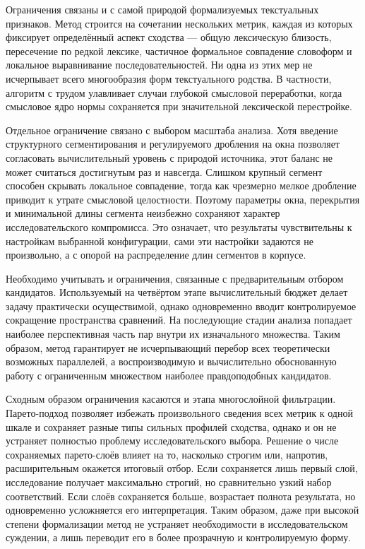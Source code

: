 Ограничения связаны и с самой природой формализуемых текстуальных признаков. Метод строится на сочетании нескольких метрик, каждая из которых фиксирует определённый аспект сходства --- общую лексическую близость, пересечение по редкой лексике, частичное формальное совпадение словоформ и локальное выравнивание последовательностей. Ни одна из этих мер не исчерпывает всего многообразия форм текстуального родства. В частности, алгоритм с трудом улавливает случаи глубокой смысловой переработки, когда смысловое ядро нормы сохраняется при значительной лексической перестройке.

Отдельное ограничение связано с выбором масштаба анализа. Хотя введение структурного сегментирования и регулируемого дробления на окна позволяет согласовать вычислительный уровень с природой источника, этот баланс не может считаться достигнутым раз и навсегда. Слишком крупный сегмент способен скрывать локальное совпадение, тогда как чрезмерно мелкое дробление приводит к утрате смысловой целостности. Поэтому параметры окна, перекрытия и минимальной длины сегмента неизбежно сохраняют характер исследовательского компромисса. Это означает, что результаты чувствительны к настройкам выбранной конфигурации, сами эти настройки задаются не произвольно, а с опорой на распределение длин сегментов в корпусе.

Необходимо учитывать и ограничения, связанные с предварительным отбором кандидатов. Используемый на четвёртом этапе вычислительный бюджет делает задачу практически осуществимой, однако одновременно вводит контролируемое сокращение пространства сравнений. На последующие стадии анализа попадает наиболее перспективная часть пар внутри их изначального множества. Таким образом, метод гарантирует не исчерпывающий перебор всех теоретически возможных параллелей, а воспроизводимую и вычислительно обоснованную работу с ограниченным множеством наиболее правдоподобных кандидатов.

Сходным образом ограничения касаются и этапа многослойной фильтрации. Парето-подход позволяет избежать произвольного сведения всех метрик к одной шкале и сохраняет разные типы сильных профилей сходства, однако и он не устраняет полностью проблему исследовательского выбора. Решение о числе сохраняемых парето-слоёв влияет на то, насколько строгим или, напротив, расширительным окажется итоговый отбор. Если сохраняется лишь первый слой, исследование получает максимально строгий, но сравнительно узкий набор соответствий. Если слоёв сохраняется больше, возрастает полнота результата, но одновременно усложняется его интерпретация. Таким образом, даже при высокой степени формализации метод не устраняет необходимости в исследовательском суждении, а лишь переводит его в более прозрачную и контролируемую форму.

